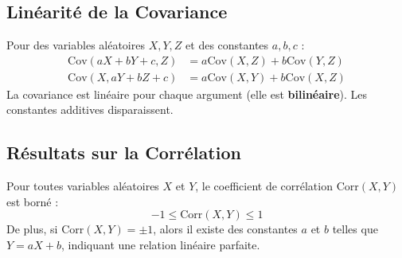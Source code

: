 \subsection{Linéarité de la Covariance}

\begin{definitionbox}
Pour des variables aléatoires $X, Y, Z$ et des constantes $a, b, c$ :
\begin{align*}
\text{Cov}(aX + bY + c, Z) &= a\text{Cov}(X, Z) + b\text{Cov}(Y, Z) \\
\text{Cov}(X, aY + bZ + c) &= a\text{Cov}(X, Y) + b\text{Cov}(X, Z)
\end{align*}
La covariance est linéaire pour chaque argument (elle est \textbf{bilinéaire}). Les constantes additives disparaissent.
\end{definitionbox}

\subsection{Résultats sur la Corrélation}

\begin{theorembox}
Pour toutes variables aléatoires $X$ et $Y$, le coefficient de corrélation $\text{Corr}(X,Y)$ est borné :
$$-1 \le \text{Corr}(X,Y) \le 1$$
De plus, si $\text{Corr}(X,Y) = \pm 1$, alors il existe des constantes $a$ et $b$ telles que $Y = aX + b$, indiquant une relation linéaire parfaite.
\end{theorembox}

